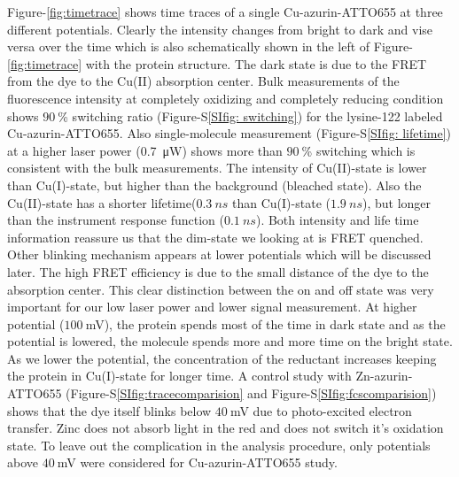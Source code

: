 \documentclass[journal=jacsat,manuscript=article]{achemso}
\begin{document}
Figure-\ref{fig:timetrace} shows time traces of a single Cu-azurin-ATTO655 at three different potentials. Clearly the intensity changes from bright to dark and vise versa over the time which is also schematically shown in the left of Figure-\ref{fig:timetrace} with the protein structure. The dark state is due to the FRET from the dye to the Cu(II) absorption center\cite{kuznetsova2006a}. Bulk measurements of the fluorescence intensity at completely oxidizing and completely reducing condition shows $90~$\% switching ratio (Figure-S\ref{SIfig: switching}) for the lysine-122\cite{nicolardi2012topdown} labeled Cu-azurin-ATTO655. Also single-molecule measurement (Figure-S\ref{SIfig: lifetime}) at a higher laser power (\SI{0.7}{\micro\watt}) shows more than $90~$\% switching which is consistent with the bulk measurements. The intensity of Cu(II)-state is lower than Cu(I)-state, but higher than the background (bleached state). Also the Cu(II)-state has a shorter lifetime($0.3~ns$ than Cu(I)-state ($1.9~ns$), but longer than the instrument response function ($0.1~ns$). Both intensity and life time information reassure us that the dim-state we looking at is FRET quenched. Other blinking mechanism appears at lower potentials which will be discussed later. The high FRET efficiency is due to the small distance of the dye to the absorption center. This clear distinction between the on and off state was very important for our low laser power and lower signal measurement. At higher potential ($100~$mV), the protein spends most of the time in dark state and as the potential is lowered, the molecule spends more and more time on the bright state. As we lower the potential, the concentration of the reductant increases keeping the protein in Cu(I)-state for longer time. A control study with Zn-azurin-ATTO655 (Figure-S\ref{SIfig:tracecomparision} and Figure-S\ref{SIfig:fcscomparision}) shows that the dye itself blinks below $40~$mV due to photo-excited electron transfer. Zinc does not absorb light in the red and does not switch it's oxidation state. To leave out the complication in the analysis procedure, only potentials above $40~$mV were considered for Cu-azurin-ATTO655 study.\\
\end{document}
